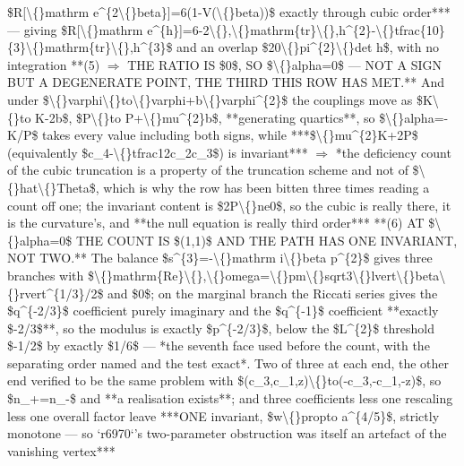 \begin{description}
\$R[\textbackslash\{\}mathrm e\textasciicircum{}\{2\textbackslash\{\}beta\}]=6(1-V(\textbackslash\{\}beta))\$ exactly through cubic order*** --- giving \$R[\textbackslash\{\}mathrm e\textasciicircum{}\{h\}]=6-2\textbackslash\{\},\textbackslash\{\}mathrm\{tr\}\textbackslash\{\},h\textasciicircum{}\{2\}-\textbackslash\{\}tfrac\{10\}\{3\}\textbackslash\{\}mathrm\{tr\}\textbackslash\{\},h\textasciicircum{}\{3\}\$ and an overlap \$20\textbackslash\{\}pi\textasciicircum{}\{2\}\textbackslash\{\}det h\$, with no integration  **(5) \ensuremath{\Rightarrow} THE RATIO IS \$0\$, SO \$\textbackslash\{\}alpha=0\$ --- NOT A SIGN BUT A DEGENERATE POINT, THE THIRD THIS ROW HAS MET.** And under \$\textbackslash\{\}varphi\textbackslash\{\}to\textbackslash\{\}varphi+b\textbackslash\{\}varphi\textasciicircum{}\{2\}\$ the couplings move as \$K\textbackslash\{\}to K-2b\$, \$P\textbackslash\{\}to P+\textbackslash\{\}mu\textasciicircum{}\{2\}b\$, **generating quartics**, so \$\textbackslash\{\}alpha=-K/P\$ takes every value including both signs, while ***\$\textbackslash\{\}mu\textasciicircum{}\{2\}K+2P\$ (equivalently \$c\_4-\textbackslash\{\}tfrac12c\_2c\_3\$) is invariant*** \ensuremath{\Rightarrow} *the deficiency count of the cubic truncation is a property of the truncation scheme and not of \$\textbackslash\{\}hat\textbackslash\{\}Theta\$, which is why the row has been bitten three times reading a count off one; the invariant content is \$2P\textbackslash\{\}ne0\$, so the cubic is really there, it is the curvature's, and **the null equation is really third order***  **(6) AT \$\textbackslash\{\}alpha=0\$ THE COUNT IS \$(1,1)\$ AND THE PATH HAS ONE INVARIANT, NOT TWO.** The balance \$s\textasciicircum{}\{3\}=-\textbackslash\{\}mathrm i\textbackslash\{\}beta p\textasciicircum{}\{2\}\$ gives three branches with \$\textbackslash\{\}mathrm\{Re\}\textbackslash\{\},\textbackslash\{\}omega=\textbackslash\{\}pm\textbackslash\{\}sqrt3\textbackslash\{\}lvert\textbackslash\{\}beta\textbackslash\{\}rvert\textasciicircum{}\{1/3\}/2\$ and \$0\$; on the marginal branch the Riccati series gives the \$q\textasciicircum{}\{-2/3\}\$ coefficient purely imaginary and the \$q\textasciicircum{}\{-1\}\$ coefficient **exactly \$-2/3\$**, so the modulus is exactly \$p\textasciicircum{}\{-2/3\}\$, below the \$L\textasciicircum{}\{2\}\$ threshold \$-1/2\$ by exactly \$1/6\$ --- *the seventh face used before the count, with the separating order named and the test exact*. Two of three at each end, the other end verified to be the same problem with \$(c\_3,c\_1,z)\textbackslash\{\}to(-c\_3,-c\_1,-z)\$, so \$n\_+=n\_-\$ and **a realisation exists**; and three coefficients less one rescaling less one overall factor leave ***ONE invariant, \$w\textbackslash\{\}propto a\textasciicircum{}\{4/5\}\$, strictly monotone --- so `r6970`'s two-parameter obstruction was itself an artefact of the vanishing vertex***

\end{description}
